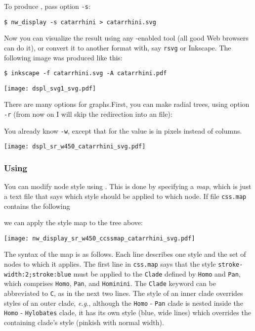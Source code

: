 To produce \svg, pass option \texttt{-s}:
\begin{verbatim}
$ nw_display -s catarrhini > catarrhini.svg
\end{verbatim}

Now you can visualize the result using any \svg-enabled tool (all good Web browsers can do it), or convert it to another format with, say \texttt{rsvg} or Inkscape. The following image was produced like this:

\begin{verbatim}
$ inkscape -f catarrhini.svg -A catarrhini.pdf
\end{verbatim}

\begin{center}
 \texttt{[image: dspl\_svg1\_svg.pdf]}
\end{center}

There are many options for \svg{} graphs.First, you can make radial trees, using option \texttt{-r} (from now on I will skip the redirection into an \svg{} file):



You already know \texttt{-w}, except that for \svg{} the value is in pixels instead of columns. 

\begin{center}
\texttt{[image: dspl\_sr\_w450\_catarrhini\_svg.pdf]}
\end{center}

\subsubsection{Using \css}
\label{sct_display_svg_css}

You can modify node style using \css. This is done by specifying a
\textit{\css{} map}, which is just a text file that says which style should be
applied to which node. If file \texttt{css.map} contains the following
\begin{quote}  \end{quote} we can apply the style map to
the tree above:



\begin{center}
 \texttt{[image: nw\_display\_sr\_w450\_ccssmap\_catarrhini\_svg.pdf]}
\end{center}

The syntax of the \css{} map is as follows. Each line describes one style and the set of nodes to which it applies. The first line in \texttt{css.map} says that the style \texttt{stroke-width:2;stroke:blue} must be applied to the \texttt{Clade} defined by \texttt{Homo} and \texttt{Pan}, which comprises \texttt{Homo}, \texttt{Pan}, and \texttt{Hominini}. The \texttt{Clade} keyword can be abbreviated to \texttt{C}, as in the next two lines. The style of an inner clade overrides styles of an outer clade, \textit{e.g.}, although the \texttt{Homo} - \texttt{Pan} clade is nested inside the \texttt{Homo} - \texttt{Hylobates} clade, it has its own style (blue, wide lines) which overrides the containing clade's style (pinkish with normal width).

